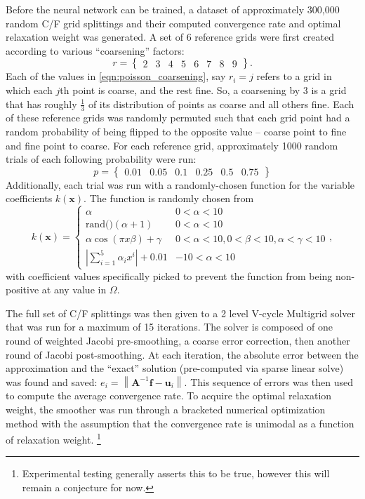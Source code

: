 \documentclass{siamart190516}
\newcommand{\norm}[1]{\left\lVert#1\right\rVert}
\newcommand{\abs}[1]{\left\lvert#1\right\rvert}
\newcommand{\mat}[1]{\bm{{#1}}}
\renewcommand{\vec}[1]{\bm{{#1}}}
\begin{document}
Before the neural network can be trained, a dataset of approximately 300,000 random C/F grid splittings and their computed convergence rate and optimal relaxation weight was generated.  A set of $6$ reference grids were first created according to various ``coarsening'' factors:
%
\begin{equation} \label{eqn:poisson_coarsening}
  r = \begin{Bmatrix} 2 & 3 & 4 & 5 & 6 & 7 & 8 & 9\end{Bmatrix}.
\end{equation}
%
Each of the values in \ref{eqn:poisson_coarsening}, say $r_i = j$ refers to a grid in which each $j$th point is coarse, and the rest fine.  So, a coarsening by $3$ is a grid that has roughly $\frac{1}{3}$ of its distribution of points as coarse and all others fine.  Each of these reference grids was randomly permuted such that each grid point had a random probability of being flipped to the opposite value -- coarse point to fine and fine point to coarse.  For each reference grid, approximately 1000 random trials of each following probability were run:
%
\begin{equation} \label{eqn:poisson_probabilities}
  p = \begin{Bmatrix} 0.01 & 0.05 & 0.1 & 0.25 & 0.5 & 0.75 \end{Bmatrix}
\end{equation}
%
Additionally, each trial was run with a randomly-chosen function for the variable coefficients $k\left(\vec{x}\right)$.  The function is randomly chosen from
%
\begin{equation} \label{eqn:poisson_varcoefficients}
k\left(\vec{x}\right) = \begin{cases}
\alpha & 0 < \alpha < 10 \\
\text{rand()}\left(\alpha + 1\right) & 0 < \alpha < 10 \\
\alpha\cos\left(\pi x \beta\right) + \gamma & 0 < \alpha < 10, 0 < \beta < 10, \alpha < \gamma < 10\\
\abs{\sum_{i=1}^5 \alpha_i x^i} + 0.01 & -10 < \alpha < 10
\end{cases},
\end{equation}
%
with coefficient values specifically picked to prevent the function from being non-positive at any value in $\Omega$.

The full set of C/F splittings was then given to a 2 level V-cycle Multigrid solver that was run for a maximum of 15 iterations.  The solver is composed of one round of weighted Jacobi pre-smoothing, a coarse error correction, then another round of Jacobi post-smoothing.  At each iteration, the absolute error between the approximation and the ``exact'' solution (pre-computed via sparse linear solve) was found and saved: $e_i = \norm{\mat{A}^{-1}\vec{f} - \vec{u}_i}$.  This sequence of errors was then used to compute the average convergence rate.  To acquire the optimal relaxation weight, the smoother was run through a bracketed numerical optimization method with the assumption that the convergence rate is unimodal as a function of relaxation weight. \footnote{Experimental testing generally asserts this to be true, however this will remain a conjecture for now.}
\end{document}
